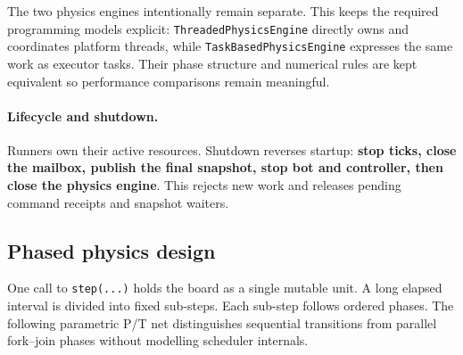 The two physics engines intentionally remain separate. This keeps the required
programming models explicit: \texttt{ThreadedPhysicsEngine} directly owns and
coordinates platform threads, while \texttt{TaskBasedPhysicsEngine} expresses
the same work as executor tasks. Their phase structure and numerical rules are
kept equivalent so performance comparisons remain meaningful.

\paragraph{Lifecycle and shutdown.}
Runners own their active resources. Shutdown reverses startup: \textbf{stop
ticks, close the mailbox, publish the final snapshot, stop bot and controller,
then close the physics engine}. This rejects new work and releases pending
command receipts and snapshot waiters.

\clearpage
\subsection{Phased physics design}

One call to \texttt{step(...)} holds the board as a single mutable unit. A long
elapsed interval is divided into fixed sub-steps. Each sub-step follows ordered
phases. The following parametric P/T net distinguishes sequential transitions
from parallel fork--join phases without modelling scheduler internals.


